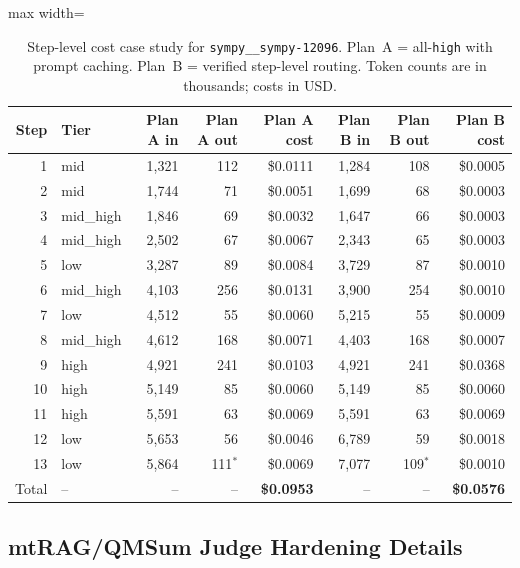 \begin{table}[ht]
\centering
\scriptsize
\caption{Step-level cost case study for \texttt{sympy\_\_sympy-12096}.
Plan~A = all-\texttt{high} with prompt caching.
Plan~B = verified step-level routing.
Token counts are in thousands; costs in USD.}
\label{tab:appendix-sympy}
\begin{adjustbox}{max width=\linewidth}
\begin{tabular}{r l r r r r r r}
\toprule
Step & Tier & Plan A in & Plan A out & Plan A cost & Plan B in & Plan B out & Plan B cost \\
\midrule
 1 & mid      & 1,321 & 112 & \$0.0111 & 1,284 & 108 & \$0.0005 \\
 2 & mid      & 1,744 &  71 & \$0.0051 & 1,699 &  68 & \$0.0003 \\
 3 & mid\_high & 1,846 &  69 & \$0.0032 & 1,647 &  66 & \$0.0003 \\
 4 & mid\_high & 2,502 &  67 & \$0.0067 & 2,343 &  65 & \$0.0003 \\
 5 & low      & 3,287 &  89 & \$0.0084 & 3,729 &  87 & \$0.0010 \\
 6 & mid\_high & 4,103 & 256 & \$0.0131 & 3,900 & 254 & \$0.0010 \\
 7 & low      & 4,512 &  55 & \$0.0060 & 5,215 &  55 & \$0.0009 \\
 8 & mid\_high & 4,612 & 168 & \$0.0071 & 4,403 & 168 & \$0.0007 \\
 9 & high     & 4,921 & 241 & \$0.0103 & 4,921 & 241 & \$0.0368 \\
10 & high     & 5,149 &  85 & \$0.0060 & 5,149 &  85 & \$0.0060 \\
11 & high     & 5,591 &  63 & \$0.0069 & 5,591 &  63 & \$0.0069 \\
12 & low      & 5,653 &  56 & \$0.0046 & 6,789 &  59 & \$0.0018 \\
13 & low      & 5,864 & 111$^{*}$ & \$0.0069 & 7,077 & 109$^{*}$ & \$0.0010 \\
\midrule
Total & -- & -- & -- & \textbf{\$0.0953} & -- & -- & \textbf{\$0.0576} \\
\bottomrule
\end{tabular}
\end{adjustbox}
\end{table}

\subsection{mtRAG/QMSum Judge Hardening Details}
\label{app:judge}

